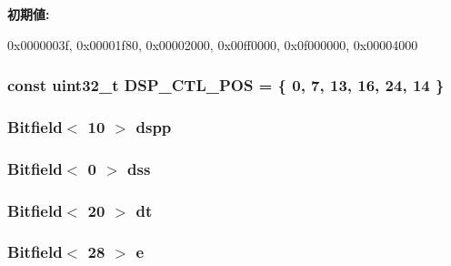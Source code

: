 \label{namespaceMipsISA_a5bb9a799de2f7a0b358e24ef4255787b}
{\bfseries 初期値:}
\begin{DoxyCode}

{ 0x0000003f, 0x00001f80, 0x00002000,
  0x00ff0000, 0x0f000000, 0x00004000 }
\end{DoxyCode}
\hypertarget{namespaceMipsISA_a03ca0e5afd6e4d4ca5cd14a2c0e42122}{
\subsubsection[{DSP\_\-CTL\_\-POS}]{\setlength{\rightskip}{0pt plus 5cm}const {\bf uint32\_\-t} {\bf DSP\_\-CTL\_\-POS} = \{ 0, 7, 13, 16, 24, 14 \}}}
\label{namespaceMipsISA_a03ca0e5afd6e4d4ca5cd14a2c0e42122}
\hypertarget{namespaceMipsISA_abf9c3409798ceb97ce38fdd3d3b9b09e}{
\subsubsection[{dspp}]{\setlength{\rightskip}{0pt plus 5cm}Bitfield$<$ 10 $>$ {\bf dspp}}}
\label{namespaceMipsISA_abf9c3409798ceb97ce38fdd3d3b9b09e}
\hypertarget{namespaceMipsISA_ab60f27404f01653104f8cd2cd4fa9922}{
\subsubsection[{dss}]{\setlength{\rightskip}{0pt plus 5cm}Bitfield$<$ 0 $>$ {\bf dss}}}
\label{namespaceMipsISA_ab60f27404f01653104f8cd2cd4fa9922}
\hypertarget{namespaceMipsISA_a5543f80125ece4166f92d57587fae732}{
\subsubsection[{dt}]{\setlength{\rightskip}{0pt plus 5cm}Bitfield$<$ 20 $>$ {\bf dt}}}
\label{namespaceMipsISA_a5543f80125ece4166f92d57587fae732}
\hypertarget{namespaceMipsISA_a6be71739c6e49d0bbbd4d7bb97e0853a}{
\subsubsection[{e}]{\setlength{\rightskip}{0pt plus 5cm}Bitfield$<$ 28 $>$ {\bf e}}}
\label{namespaceMipsISA_a6be71739c6e49d0bbbd4d7bb97e0853a}
